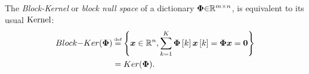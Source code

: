 \begin{Mydefinition}
\leftbar
The \emph {Block-Kernel} or \emph {block null space} of a dictionary $\boldsymbol{\Phi} {\in} \mathbb{R}^{m {\times} n}$, is equivalent to its usual $\mathrm{Kernel}$: 
\begin{gather*}
\label{eq:Block Kernel}
\begin{aligned}
\myBKerMath &\myeq \mybrace{\boldsymbol{x} \in \mathbb{R}^n, \displaystyle\sum_{k=1}^{K} \myPhi\mybracket{k}\boldsymbol{x}\mybracket{k} = \myPhi \boldsymbol{x} = \boldsymbol{0}} \\ 
&= \myKerMath.
\end{aligned}
\end{gather*}
\endleftbar
\end{Mydefinition}